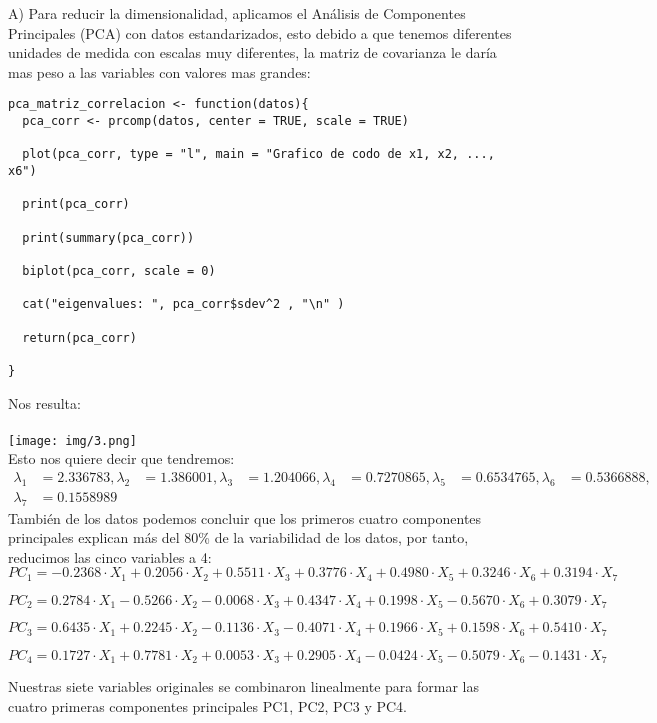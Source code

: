 \begin{sol}
A) Para reducir la dimensionalidad, aplicamos el Análisis de Componentes Principales (PCA) con datos estandarizados, esto debido a que tenemos diferentes unidades de medida con escalas muy diferentes, la matriz de covarianza le daría mas peso a las variables con valores mas grandes:
\begin{verbatim}
pca_matriz_correlacion <- function(datos){
  pca_corr <- prcomp(datos, center = TRUE, scale = TRUE)

  plot(pca_corr, type = "l", main = "Grafico de codo de x1, x2, ..., x6")

  print(pca_corr)

  print(summary(pca_corr))

  biplot(pca_corr, scale = 0)

  cat("eigenvalues: ", pca_corr$sdev^2 , "\n" )

  return(pca_corr)

}
\end{verbatim}
Nos resulta:\\\\
\texttt{[image: img/3.png]}\\
Esto nos quiere decir que tendremos:
\begin{align*}
\lambda_1 &= 2.336783,
\lambda_2 &= 1.386001,
\lambda_3 &= 1.204066, 
\lambda_4 &= 0.7270865, 
\lambda_5 &= 0.6534765, 
\lambda_6 &= 0.5366888, \\
\lambda_7 &= 0.1558989
\end{align*}
También de los datos podemos concluir que los primeros cuatro componentes principales explican más del 80\% de la variabilidad de los datos, por tanto, reducimos las cinco variables a 4:
\[
PC_1 = -0.2368 \cdot X_1 + 0.2056 \cdot X_2 + 0.5511 \cdot X_3 + 0.3776 \cdot X_4 + 0.4980 \cdot X_5 + 0.3246 \cdot X_6 + 0.3194 \cdot X_7
\]

\[
PC_2 = 0.2784 \cdot X_1 - 0.5266 \cdot X_2 - 0.0068 \cdot X_3 + 0.4347 \cdot X_4 + 0.1998 \cdot X_5 - 0.5670 \cdot X_6 + 0.3079 \cdot X_7
\]

\[
PC_3 = 0.6435 \cdot X_1 + 0.2245 \cdot X_2 - 0.1136 \cdot X_3 - 0.4071 \cdot X_4 + 0.1966 \cdot X_5 + 0.1598 \cdot X_6 + 0.5410 \cdot X_7
\]

\[
PC_4 = 0.1727 \cdot X_1 + 0.7781 \cdot X_2 + 0.0053 \cdot X_3 + 0.2905 \cdot X_4 - 0.0424 \cdot X_5 - 0.5079 \cdot X_6 - 0.1431 \cdot X_7
\]

Nuestras siete variables originales se combinaron linealmente para formar las cuatro primeras componentes principales PC1, PC2, PC3 y PC4.


\end{sol}
